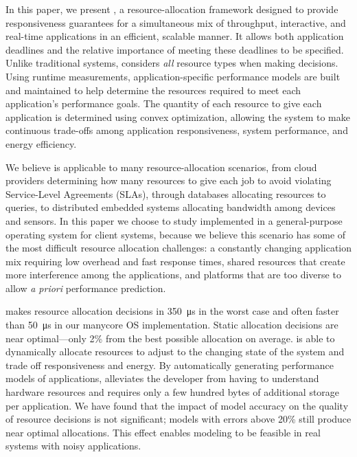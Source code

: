 In this paper, we present \pacora, a resource-allocation framework designed to
provide responsiveness guarantees for a simultaneous mix of throughput,
interactive, and real-time applications in an efficient, scalable
manner.  It allows both application deadlines and the relative
importance of meeting these deadlines to be specified.  Unlike
traditional systems, \pacora considers \emph{all} resource types when
making decisions.  Using runtime measurements, application-specific
performance models are built and maintained to help determine the
resources required to meet each application's performance goals.  The
quantity of each resource to give each application is determined using
convex optimization, allowing the system to make continuous trade-offs
among application responsiveness, system performance, and energy
efficiency.

We believe \pacora is applicable to many resource-allocation
scenarios, from cloud providers determining how many resources to give
each job to avoid violating Service-Level Agreements (SLAs), through databases allocating
resources to queries, to distributed embedded systems allocating
bandwidth among devices and sensors.  In this paper we choose to study
\pacora implemented in a general-purpose operating system for client
systems, because we believe this scenario has some of the most
difficult resource allocation challenges: a constantly changing
application mix requiring low overhead and fast response times, shared
resources that create more interference among the applications, and
platforms that are too diverse to allow \emph{a priori} performance
prediction.

\pacora makes resource allocation decisions in \SI{350}{\micro\second} in the worst case and often faster than \SI{50}{\micro\second} in our manycore OS implementation.  Static allocation decisions are
near optimal---only 2\% from the best possible allocation on average.
\pacora is able to dynamically allocate resources to adjust to the
changing state of the system and trade off responsiveness and
energy. By automatically generating performance models of
applications, \pacora alleviates the developer from having to
understand hardware resources and requires only a few hundred bytes of
additional storage per application.  We have found that the impact of model accuracy on the quality of resource decisions is not significant; models with errors above 20\% still produce near optimal allocations.  This effect enables modeling to be feasible in real systems with noisy applications.

